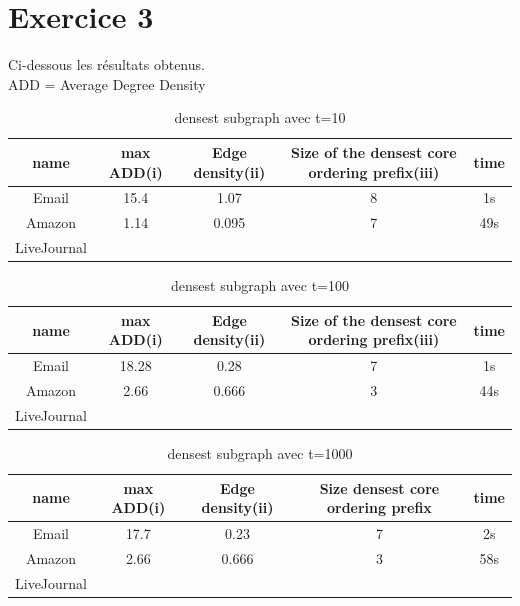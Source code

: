 \documentclass[a4paper,10pt]{report}
\begin{document}
\section{Exercice 3}
Ci-dessous les résultats obtenus. \\
ADD = Average Degree Density\\
\begin{table}[ht]
\caption{densest subgraph avec t=10}
\centering
\begin{tabular}{|c c c c c|}
\hline\hline
name & max ADD(i)&Edge density(ii)&Size of the densest core ordering prefix(iii) & time \\[0.5ex]
\hline

Email & 15.4 & 1.07 & 8 & 1s \\
Amazon & 1.14 & 0.095 & 7 & 49s \\
LiveJournal & &  &  &   \\

\hline
\end{tabular}
\label {table:nonlin}
\end{table}

\begin{table}[ht]
\caption{densest subgraph avec t=100}
\centering
\begin{tabular}{|c c c c c|}
\hline\hline
name & max ADD(i)&Edge density(ii)&Size of the densest core ordering prefix(iii) & time \\[0.5ex]
\hline
Email & 18.28 & 0.28& 7 & 1s \\
Amazon & 2.66 & 0.666 & 3 & 44s \\
LiveJournal & &  &  &   \\

\hline
\end{tabular}
\label {table:nonlin}
\end{table}

\begin{table}[ht]
\caption{densest subgraph avec t=1000}
\begin{tabular}{|c c c c c|}
\hline\hline
name & max ADD(i)&Edge density(ii)&Size densest core ordering prefix & time \\[0.23ex]
\hline

Email & 17.7 & 0.23 & 7 & 2s \\
Amazon & 2.66 & 0.666 & 3 & 58s \\
LiveJournal & &  &  &   \\

\hline
\end{tabular}
\label {table:nonlin}
\end{table}
\end{document}
